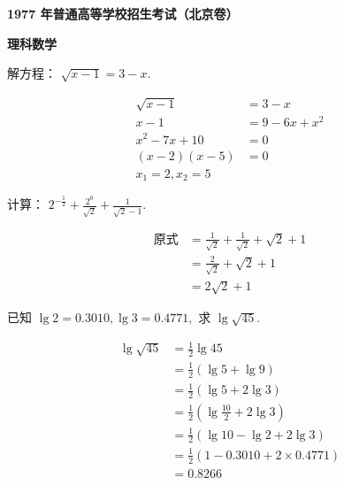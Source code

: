 \documentclass[answers]{exam}
\begin{document}
\begin{center}
	\textbf{\large{1977 年普通高等学校招生考试（北京卷） }}

	\textbf{\LARGE{理科数学}}
\end{center}
\begin{questions}
	\question 解方程： \( \sqrt{x - 1} = 3 - x \).
	\begin{solution}
		\begin{align*}
			\sqrt{x - 1}  & = 3 - x        \\
			x - 1         & = 9 - 6x + x^2 \\
			x^2 - 7x + 10 & = 0            \\
			(x-2)(x-5)    & = 0            \\
			x_1 = 2, x_2 = 5
		\end{align*}
	\end{solution}

	\question 计算： \( 2^{-\frac12} + \frac{2^0}{\sqrt{2}} + \frac{1}{\sqrt{2} - 1}. \)

	\begin{solution}
		\begin{align*}
			\text{原式} & = \frac{1}{\sqrt{2}} + \frac{1}{\sqrt{2}} + \sqrt{2} + 1 \\
			            & = \frac{2}{\sqrt{2}} + \sqrt{2} + 1                      \\
			            & = 2\sqrt{2} + 1
		\end{align*}
	\end{solution}

	\question 已知 \( \lg2 = 0.3010, \lg3 = 0.4771, \) 求 \( \lg\sqrt{45} \).

	\begin{solution}
		\begin{align*}
			\lg\sqrt{45} & = \frac12\lg{45}                        \\
			             & = \frac12(\lg5 + \lg9)                  \\
			             & = \frac12(\lg5 + 2\lg3)                 \\
			             & = \frac12(\lg\frac{10}{2} + 2\lg3)      \\
			             & = \frac12(\lg10 - \lg2 + 2\lg3)         \\
			             & = \frac12(1 - 0.3010 + 2 \times 0.4771) \\
			             & = 0.8266
		\end{align*}
	\end{solution}


\end{questions}
\end{document}
